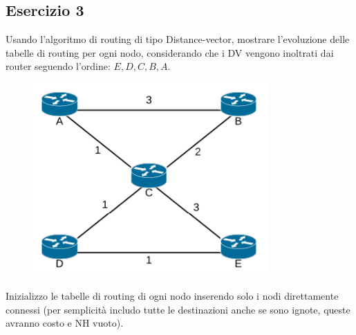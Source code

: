 \documentclass[10pt]{article}
\begin{document}
	\subsection{Esercizio 3}
	Usando l'algoritmo di routing di tipo Distance-vector, mostrare l'evoluzione delle tabelle di routing per ogni nodo, considerando che i DV vengono inoltrati dai router seguendo l'ordine: ${E,D,C,B,A}$.
	\begin{figure}[h!]
	\centering
	\includegraphics[width=9cm]{esercizio3}
	\end{figure}
	\newline
	Inizializzo le tabelle di routing di ogni nodo inserendo solo i nodi direttamente connessi (per semplicità includo tutte le destinazioni anche se sono ignote, queste avranno costo e NH vuoto).
\end{document}
